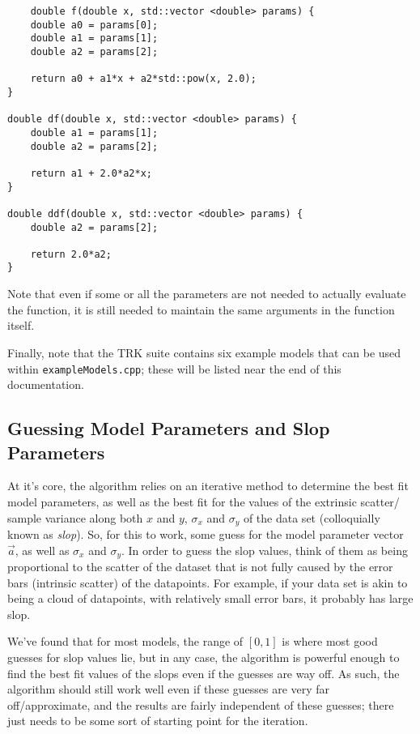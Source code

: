 \documentclass[12pt]{article}
\newcommand{\li}{\lstinline}
\begin{document}
\begin{lstlisting}
	double f(double x, std::vector <double> params) {
	double a0 = params[0];
	double a1 = params[1];
	double a2 = params[2];

	return a0 + a1*x + a2*std::pow(x, 2.0);
}

double df(double x, std::vector <double> params) {
	double a1 = params[1];
	double a2 = params[2];

	return a1 + 2.0*a2*x;
}

double ddf(double x, std::vector <double> params) {
	double a2 = params[2];

	return 2.0*a2;
}
\end{lstlisting}
Note that even if some or all the parameters are not needed to actually evaluate the function, it is still needed to maintain the same arguments in the function itself.

Finally, note that the TRK suite contains six example models that can be used within \li{exampleModels.cpp}; these will be listed near the end of this documentation.

\subsection{Guessing Model Parameters and Slop Parameters}
At it's core, the algorithm relies on an iterative method to determine the best fit model parameters, as well as the best fit for the values of the extrinsic scatter/ sample variance along both $x$ and $y$, $\sigma_x$ and $\sigma_y$ of the data set (colloquially known as \textit{slop}). So, for this to work, some guess for the model parameter vector $\vec{a}$, as well as $\sigma_x$ and $\sigma_y$. In order to guess the slop values, think of them as being proportional to the scatter of the dataset that is not fully caused by the error bars (intrinsic scatter) of the datapoints. For example, if your data set is akin to being a cloud of datapoints, with relatively small error bars, it probably has large slop. 

We've found that for most models, the range of $[0,1]$ is where most good guesses for slop values lie, but in any case, the algorithm is powerful enough to find the best fit values of the slops even if the guesses are way off. As such, the algorithm should still work well even if these guesses are very far off/approximate, and the results are fairly independent of these guesses; there just needs to be some sort of starting point for the iteration.
\end{document}
